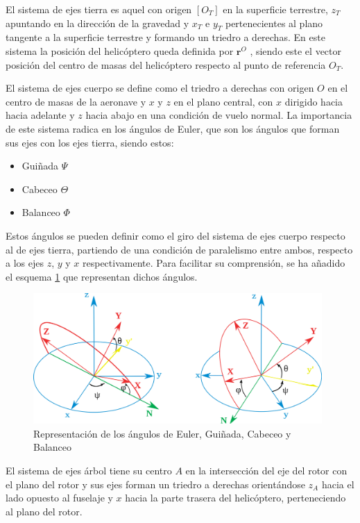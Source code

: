 El sistema de ejes tierra es aquel con origen $[O_{T}]$ en la superficie terrestre, $z_{T}$ apuntando en la dirección de la gravedad y $x_{T}$ e $y_{T}$ pertenecientes al plano tangente a la superficie terrestre y formando un triedro a derechas. En este sistema la posición del helicóptero queda definida por $\textbf{r}^{O}$ , siendo este el vector posición del centro de masas del helicóptero respecto al punto de referencia $O_{T}$.

El sistema de ejes cuerpo se define como el triedro a derechas con origen $O$ en el centro de masas de la aeronave y $x$ y $z$ en el plano central, con $x$ dirigido hacia hacia adelante y $z$ hacia abajo en una condición de vuelo normal. La importancia de este sistema radica en los ángulos de Euler, que son los ángulos que forman sus ejes con los ejes tierra, siendo estos:
\begin{itemize}
	\item Guiñada $\Psi$
	\item Cabeceo $\Theta$
	\item Balanceo $\Phi$
\end{itemize}

Estos ángulos se pueden definir como el giro del sistema de ejes cuerpo respecto al de ejes tierra, partiendo de una condición de paralelismo entre ambos, respecto a los ejes $z$, $y$ y $x$ respectivamente. Para facilitar su comprensión, se ha añadido el esquema \ref{AEuler} que representan dichos ángulos.
\begin{figure}[h]
	\centering
	\includegraphics[width=110mm]{imagenes/AEuler}
	\caption{Representación de los ángulos de Euler, Guiñada, Cabeceo y Balanceo}
	\label{AEuler}
\end{figure}

El sistema de ejes árbol tiene su centro $A$ en la intersección del eje del rotor con el plano del rotor y sus ejes forman un triedro a derechas orientándose $z_{A}$ hacia el lado opuesto al fuselaje y $x$ hacia la parte trasera del helicóptero, perteneciendo al plano del rotor.

